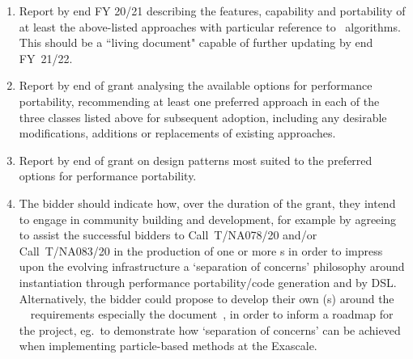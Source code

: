 
\begin{enumerate}
\item Report by end FY 20/21 describing the features, capability and portability of at least the above-listed
approaches with particular reference to \nep \  algorithms. 
This should be a ``living document" capable of further updating by end FY~21/22.

\item Report by end of grant analysing the available options for performance portability, recommending 
at least one preferred approach in each of the three classes listed above for subsequent adoption,
including any desirable modifications, additions or replacements of existing approaches.

\item Report by end of grant on design patterns most suited 
to the preferred options for performance portability.

\item The bidder should indicate how, over the duration of the grant, they intend to engage
in community building and development, for example by agreeing to assist the successful bidders
to Call~T/NA078/20 and/or Call~T/NA083/20 in the production of one or more \papp s in order to impress upon the evolving
infrastructure a `separation of concerns' philosophy around instantiation through performance
portability/code generation and by DSL. Alternatively, the bidder could propose to develop their
own \papp(s) around the \exc\ \nep\ requirements especially the document~\cite{pappeqs},
in order to inform a roadmap for the project,
eg.\ to demonstrate how `separation of concerns' can be achieved when implementing particle-based methods 
at the Exascale.

\end{enumerate}

%

